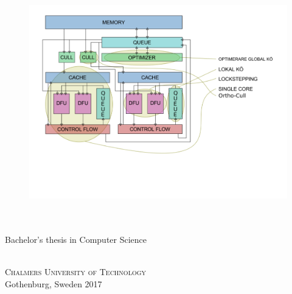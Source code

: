 
\begin{titlepage}
			
\addtolength{\voffset}{2cm}

\begin{figure}[H]
\centering
\vspace{2cm}	%
\includegraphics[width=0.9\linewidth]{figure/hardware_beta.pdf}
\end{figure}

\mbox{}
\vfill
\renewcommand{\familydefault}{\sfdefault} \normalfont %
\textbf{{\Huge 	\varHeadline}} 	\\[0.5cm]
{\Large \varSubtitle}\\[0.5cm] Bachelor's thesis in Computer Science \setlength{\parskip}{1cm}

{\Large \varNames} \setlength{\parskip}{2.9cm}

\varDepartment \\
\textsc{Chalmers University of Technology} \\
Gothenburg, Sweden 2017

\renewcommand{\familydefault}{\rmdefault} \normalfont %
\end{titlepage}


\newpage
\restoregeometry
\thispagestyle{empty}
\mbox{}


